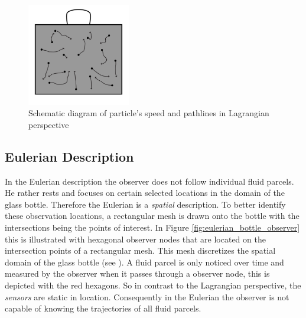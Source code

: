 \begin{figure}[htb]
\centering
{}
    \includegraphics[width=0.4\textwidth]{Figures/olive_oil_can_lagran_pathlines.pdf}
    

\caption{Schematic diagram of particle's speed and pathlines in Lagrangian perspective}
\label{fig:lagr_traj}
\end{figure}




\subsection{Eulerian Description}
\label{sec:eulerian_descr}

In the Eulerian description the observer does not follow individual fluid parcels. He rather rests and focuses on certain selected locations in the domain of the glass bottle. Therefore the Eulerian is a \emph{spatial} description. To better identify these observation locations, a rectangular mesh is drawn onto the bottle with the intersections being the points of interest. In Figure \ref{fig:eulerian_bottle_observer} this is illustrated with hexagonal observer nodes that are located on the intersection points of a rectangular mesh. This mesh discretizes
the spatial domain of the glass bottle (see ). A fluid parcel is only noticed over time and measured by the observer when it passes through a observer node, this is depicted with the red hexagons. So in contrast to the Lagrangian perspective, the \emph{sensors} are static in location. Consequently in the Eulerian the observer is not capable of knowing the trajectories of all fluid parcels.

